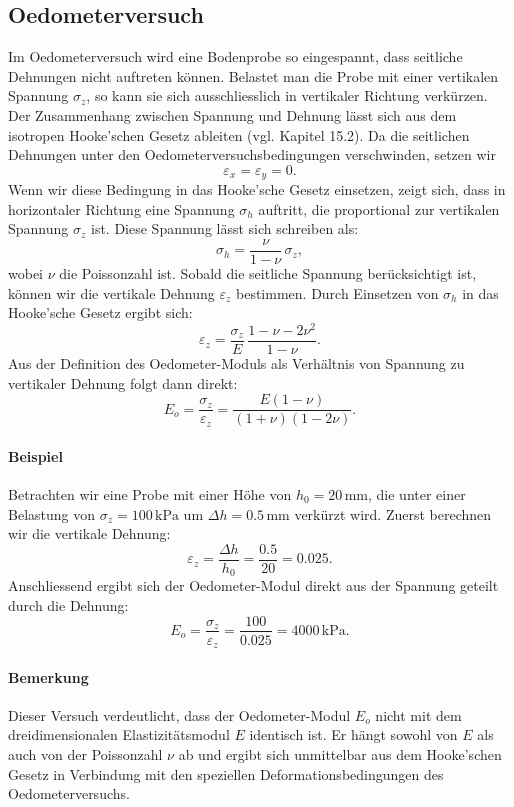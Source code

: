 \subsection{Oedometerversuch}
Im Oedometerversuch wird eine Bodenprobe so eingespannt, dass seitliche Dehnungen nicht auftreten können. 
Belastet man die Probe mit einer vertikalen Spannung \(\sigma_z\), so kann sie sich ausschliesslich in vertikaler Richtung verkürzen.  
Der Zusammenhang zwischen Spannung und Dehnung lässt sich aus dem isotropen Hooke’schen Gesetz ableiten (vgl. Kapitel 15.2). 
Da die seitlichen Dehnungen unter den Oedometerversuchsbedingungen verschwinden, setzen wir
\[
  \varepsilon_x = \varepsilon_y = 0.
\]
Wenn wir diese Bedingung in das Hooke’sche Gesetz einsetzen, zeigt sich, dass in horizontaler Richtung eine Spannung \(\sigma_h\) auftritt, die proportional zur vertikalen Spannung \(\sigma_z\) ist. 
Diese Spannung lässt sich schreiben als:
\[
  \sigma_h = \frac{\nu}{1-\nu}\,\sigma_z,
\]
wobei \(\nu\) die Poissonzahl ist.  
Sobald die seitliche Spannung berücksichtigt ist, können wir die vertikale Dehnung \(\varepsilon_z\) bestimmen. 
Durch Einsetzen von \(\sigma_h\) in das Hooke’sche Gesetz ergibt sich:
\[
  \varepsilon_z = \frac{\sigma_z}{E}\,\frac{1-\nu-2\nu^2}{1-\nu}.
\]
Aus der Definition des Oedometer-Moduls als Verhältnis von Spannung zu vertikaler Dehnung folgt dann direkt:
\[
  E_o = \frac{\sigma_z}{\varepsilon_z} = \frac{E(1-\nu)}{(1+\nu)(1-2\nu)}.
\]
\paragraph{Beispiel}   
Betrachten wir eine Probe mit einer Höhe von \(h_0 = 20\,\mathrm{mm}\), die unter einer Belastung von \(\sigma_z = 100\,\mathrm{kPa}\) um \(\Delta h = 0.5\,\mathrm{mm}\) verkürzt wird.  
Zuerst berechnen wir die vertikale Dehnung:
\[
  \varepsilon_z = \frac{\Delta h}{h_0} = \frac{0.5}{20} = 0.025.
\]
Anschliessend ergibt sich der Oedometer-Modul direkt aus der Spannung geteilt durch die Dehnung:
\[
  E_o = \frac{\sigma_z}{\varepsilon_z} = \frac{100}{0.025} = 4000\,\mathrm{kPa}.
\]
\paragraph{Bemerkung}  
Dieser Versuch verdeutlicht, dass der Oedometer-Modul \(E_o\) nicht mit dem dreidimensionalen Elastizitätsmodul \(E\) identisch ist. 
Er hängt sowohl von \(E\) als auch von der Poissonzahl \(\nu\) ab und ergibt sich unmittelbar aus dem Hooke’schen Gesetz in Verbindung mit den speziellen Deformationsbedingungen des Oedometerversuchs.